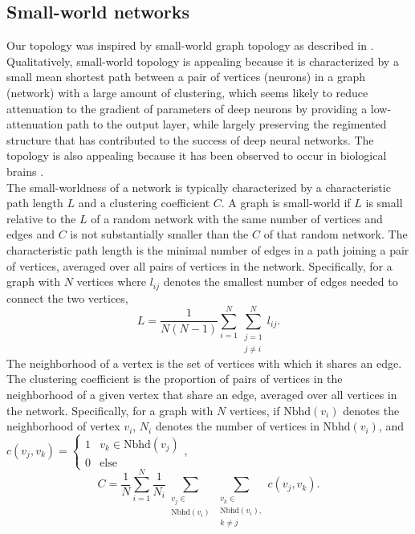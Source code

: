 \documentclass{article}
\newcommand{\npar}{\\\indent}
\begin{document}
\subsection{Small-world networks}
\label{sec:sw_background}

Our topology was inspired by small-world graph topology as described in \cite{watts98}. Qualitatively, small-world topology is appealing because it is characterized by a small mean shortest path between a pair of vertices (neurons) in a graph (network) with a large amount of clustering, which seems likely to reduce attenuation to the gradient of parameters of deep neurons by providing a low-attenuation path to the output layer, while largely preserving the regimented structure that has contributed to the success of deep neural networks. The topology is also appealing because it has been observed to occur in biological brains \cite{bullmore2009}.
\npar
The small-worldness of a network is typically characterized by a characteristic path length $L$ and a clustering coefficient $C$. A graph is small-world if $L$ is small relative to the $L$ of a random network with the same number of vertices and edges and $C$ is not substantially smaller than the $C$ of that random network. The characteristic path length is the minimal number of edges in a path joining a pair of vertices, averaged over all pairs of vertices in the network. Specifically, for a graph with $N$ vertices where $l_{ij}$ denotes the smallest number of edges needed to connect the two vertices, 
\begin{equation}
\label{eqn:charpathlength}
L=\frac{1}{N(N-1)}\sum_{i=1}^{N}\sum_{\substack{j=1\\j\neq i}}^{N}l_{ij}.
\end{equation}
The neighborhood of a vertex is the set of vertices with which it shares an edge. The clustering coefficient is the proportion of pairs of vertices in the neighborhood of a given vertex that share an edge, averaged over all vertices in the network. Specifically, for a graph with $N$ vertices, if $\text{Nbhd}(v_i)$ denotes the neighborhood of vertex $v_i$, $N_i$ denotes the number of vertices in $\text{Nbhd}(v_i)$, and $c(v_j,v_k)=\begin{cases}1 & v_k\in\text{Nbhd}(v_j)\\0 & \text{else}\end{cases}$,
\begin{equation}
\label{eqn:clustcoeff}
C=\frac{1}{N}\sum_{i=1}^{N}\frac{1}{N_i}\sum_{\substack{v_j\in\\\text{Nbhd}(v_i)}}\sum_{\substack{v_k\in\\\text{Nbhd}(v_i),\\ k\neq j}}c(v_j,v_k).
\end{equation}
\end{document}

